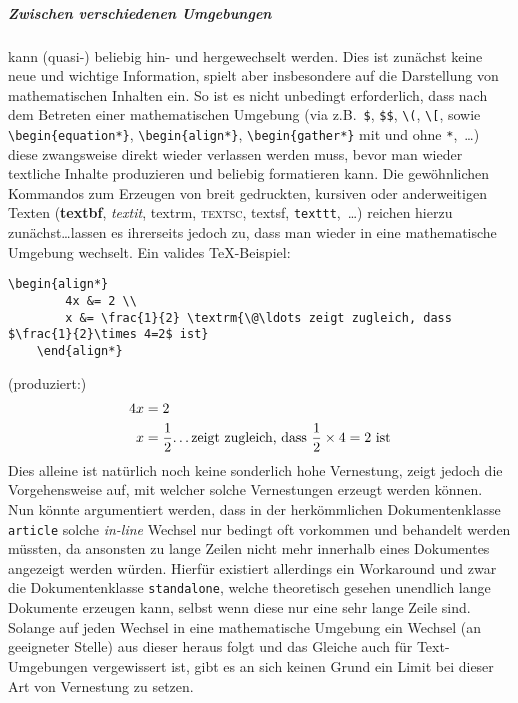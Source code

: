 \subparagraph*{Zwischen verschiedenen Umgebungen\label{subpar:envswitch}} kann (quasi-) beliebig hin- und hergewechselt werden. Dies ist zunächst keine neue und wichtige Information, spielt aber insbesondere auf die Darstellung von mathematischen Inhalten ein. So ist es nicht unbedingt erforderlich, dass nach dem Betreten einer mathematischen Umgebung (via z.B.\ \verb|$|, \verb|$$|, \verb|\(|, \verb|\[|, sowie \verb|\begin{equation*}|, \verb|\begin{align*}|, \verb|\begin{gather*}| mit und ohne \texttt{*},~\ldots) diese zwangsweise direkt wieder verlassen werden muss, bevor man wieder textliche Inhalte produzieren und beliebig formatieren kann. Die gewöhnlichen Kommandos zum Erzeugen von breit gedruckten, kursiven oder anderweitigen Texten (\textbf{textbf}, \textit{textit}, \textrm{textrm}, \textsc{textsc}, \textsf{textsf}, \texttt{texttt},~\ldots) reichen hierzu zunächst\ldots lassen es ihrerseits jedoch zu, dass man wieder in eine mathematische Umgebung wechselt. Ein valides \TeX{}-Beispiel: %
\begin{Verbatim}[breaklines=true, breakanywhere=true]
    \begin{align*}
        4x &= 2 \\
        x &= \frac{1}{2} \textrm{\@\ldots zeigt zugleich, dass $\frac{1}{2}\times 4=2$ ist}
    \end{align*}
\end{Verbatim}
(produziert:)
\begin{align*}
    4x &= 2 \\
    x &= \frac{1}{2} \textrm{\@\ldots zeigt zugleich, dass $\frac{1}{2}\times 4=2$ ist}
\end{align*}
Dies alleine ist natürlich noch keine sonderlich hohe Vernestung, zeigt jedoch die Vorgehensweise auf, mit welcher solche Vernestungen erzeugt werden können. Nun könnte argumentiert werden, dass in der herkömmlichen Dokumentenklasse \texttt{article} solche \textit{in-line} Wechsel nur bedingt oft vorkommen und behandelt werden müssten, da ansonsten zu lange Zeilen nicht mehr innerhalb eines Dokumentes angezeigt werden würden. Hierfür existiert allerdings ein Workaround und zwar die Dokumentenklasse \texttt{standalone}, welche theoretisch gesehen unendlich lange Dokumente erzeugen kann, selbst wenn diese nur eine sehr lange Zeile sind.%
Solange auf jeden Wechsel in eine mathematische Umgebung ein Wechsel (an geeigneter Stelle) aus dieser heraus folgt und das Gleiche auch für Text-Umgebungen vergewissert ist, gibt es an sich keinen Grund ein Limit bei dieser Art von Vernestung zu setzen.

